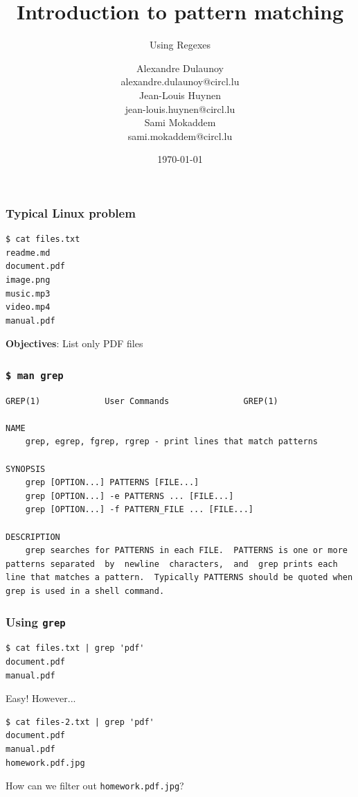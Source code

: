\documentclass{beamer}
\author{\large{Alexandre Dulaunoy}\\ \scriptsize{alexandre.dulaunoy@circl.lu}\\ \large{Jean-Louis Huynen}\\ \scriptsize{jean-louis.huynen@circl.lu}\\ \large{Sami Mokaddem}\\ \scriptsize{sami.mokaddem@circl.lu}\\}
\title{Introduction to pattern matching}
\subtitle{Using Regexes}
\institute{info@circl.lu}
\date{\today}
\begin{document}
\begin{frame}[t,plain]
\titlepage
\end{frame}

\begin{frame}[fragile]
\frametitle{Typical Linux problem}
\begin{lstlisting}
$ cat files.txt
readme.md
document.pdf
image.png
music.mp3
video.mp4
manual.pdf
\end{lstlisting}

    \begin{center}
         \textbf{Objectives}: List only PDF files
    \end{center}
\end{frame}

\begin{frame}[fragile]
\frametitle{\texttt{\$ man grep}}
\begin{lstlisting}
GREP(1)             User Commands               GREP(1)

NAME
    grep, egrep, fgrep, rgrep - print lines that match patterns

SYNOPSIS
    grep [OPTION...] PATTERNS [FILE...]
    grep [OPTION...] -e PATTERNS ... [FILE...]
    grep [OPTION...] -f PATTERN_FILE ... [FILE...]

DESCRIPTION
    grep searches for PATTERNS in each FILE.  PATTERNS is one or more patterns separated  by  newline  characters,  and  grep prints each line that matches a pattern.  Typically PATTERNS should be quoted when grep is used in a shell command.
\end{lstlisting}
\end{frame}

\begin{frame}[fragile]
\frametitle{Using \texttt{grep}}
\begin{lstlisting}
$ cat files.txt | grep 'pdf'
document.pdf
manual.pdf
\end{lstlisting}
\begin{center}
    Easy! However...
\end{center}
\pause
\begin{lstlisting}
$ cat files-2.txt | grep 'pdf'
document.pdf
manual.pdf
homework.pdf.jpg
\end{lstlisting}

\begin{center}
    How can we filter out \texttt{homework.pdf.jpg}?
\end{center}
\end{frame}
\end{document}

